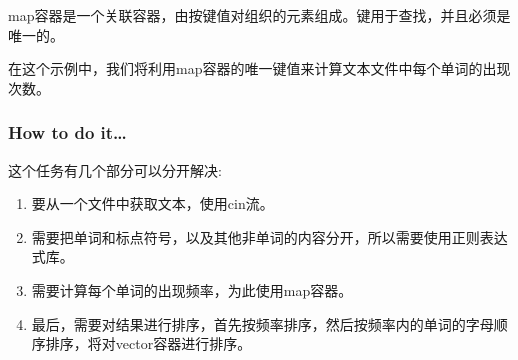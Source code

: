 
map容器是一个关联容器，由按键值对组织的元素组成。键用于查找，并且必须是唯一的。

在这个示例中，我们将利用map容器的唯一键值来计算文本文件中每个单词的出现次数。

\subsubsection{How to do it…}

这个任务有几个部分可以分开解决:

\begin{enumerate}
\item 
要从一个文件中获取文本，使用cin流。

\item 
需要把单词和标点符号，以及其他非单词的内容分开，所以需要使用正则表达式库。

\item 
需要计算每个单词的出现频率，为此使用map容器。

\item 
最后，需要对结果进行排序，首先按频率排序，然后按频率内的单词的字母顺序排序，将对vector容器进行排序。
\end{enumerate}

